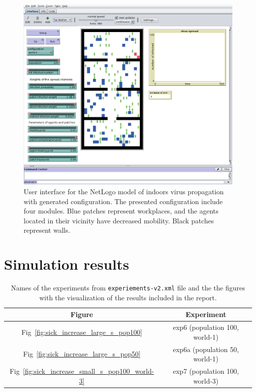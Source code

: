 \documentclass[10pt,a4paper]{article}
\begin{document}
\begin{figure}[ht!]
\begin{center}
\includegraphics[scale=0.3]{plots/model-gui.png}
\end{center}
\caption{User interface for the NetLogo model of indoors virus propagation with generated configuration. The presented configuration include four modules. Blue patches represent workplaces, and the agents located in their vicinity have decreased mobility. Black patches represent walls.}
\label{fig:gui-world-3}
\end{figure}


\section{Simulation results}

\begin{table}[ht!]
\centering
\begin{tabular}{|c|c|}
\hline
\textbf{Figure} & \textbf{Experiment} \\
\hline
Fig~\ref{fig:sick_increase_large_s_pop100} & exp6  (population 100, world-1)\\
\hline
Fig~\ref{fig:sick_increase_large_s_pop50} & exp6a (population 50, world-1)\\ 
\hline
Fig~\ref{fig:sick_increase_small_s_pop100_world-3} & exp7 (population 100, world-3) \\
\hline
\end{tabular}
\caption{Names of the experiments from \texttt{experiements-v2.xml} file and the the figures with the visualization of the results included in the report.}
\end{table}
\end{document}
